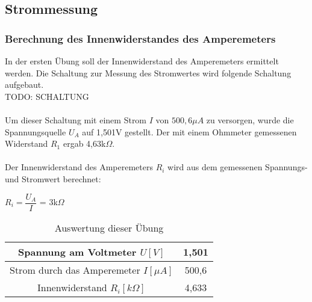 \subsection{Strommessung}
\subsubsection{Berechnung des Innenwiderstandes des Amperemeters}
In der ersten Übung soll der Innenwiderstand des Amperemeters ermittelt werden. Die Schaltung zur Messung des Stromwertes wird folgende Schaltung aufgebaut.
~\\
TODO: SCHALTUNG		\\
~\\
Um dieser Schaltung mit einem Strom $I$ von $500,6\mu A$ zu versorgen, wurde die Spannungsquelle $U_A$ auf 1,501V gestellt. Der mit einem Ohmmeter gemessenen Widerstand $R_1$ ergab 4,63k$\Omega$. \\
~\\
Der Innenwiderstand des Amperemeters $R_i$ wird aus dem gemessenen Spannungs- und Stromwert berechnet:
\begin{center}
$R_i = \dfrac{U_A}{I}$ = 3k$\Omega$
\end{center}
\begin{table}[h]
	\centering
	\begin{tabular}{|c|c|}
	\hline 
	Spannung am Voltmeter $U [V]$				& 1,501	\\ 
	\hline 
	Strom durch das Amperemeter $I [\mu A]$ 		& 500,6	\\ 
	\hline 
	Innenwiderstand $R_i [k\Omega]$			& 4,633	\\ 
	\hline 
	\end{tabular}
	\caption{Auswertung dieser Übung}
\end{table}

